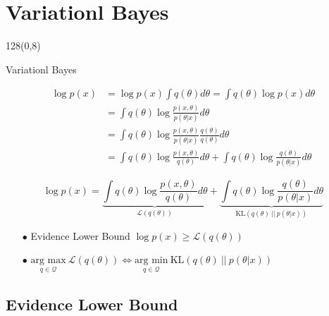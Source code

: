 \documentclass[shownotes]{beamer}
\begin{document}
\section{Variationl Bayes}

\begin{frame}
 \begin{textblock}{128}(0,8)
\begin{center}
 \large Variationl Bayes
\end{center}
\end{textblock}

\begin{equation*}
 \begin{split}
 \log p(x) &= \log p(x) \int q(\theta) d\theta =  \int q(\theta) \log p(x) d\theta \\
 & = \int q(\theta) \log \frac{p(x,\theta)}{p(\theta|x)} d\theta \\
 & = \int q(\theta) \log \frac{p(x,\theta)}{p(\theta|x)} \frac{q(\theta)}{q(\theta)} d\theta \\
 & = \int q(\theta) \log \frac{p(x,\theta)}{q(\theta)} d\theta + \int q(\theta) \log \frac{q(\theta)}{p(\theta|x)} d\theta 
 \end{split}
\end{equation*}


\end{frame}

\begin{frame}

\begin{equation*}
 \log p(x)  = \underbrace{\int q(\theta) \log \frac{p(x,\theta)}{q(\theta)} d\theta}_{\mathcal{L}(q(\theta))} + \underbrace{\int q(\theta) \log \frac{q(\theta)}{p(\theta|x)} d\theta}_{\text{KL}(q(\theta) \ || \ p(\theta|x))}  
\end{equation*}


\pause

\begin{itemize}
 \item[$\bullet$] Evidence Lower Bound $\log p(x) \geq \mathcal{L}(q(\theta))$
 \item[$\bullet$] $ \underset{q \in \mathcal{Q}}{\text{arg max}} \ \mathcal{L}(q(\theta)) \Leftrightarrow\underset{q \in \mathcal{Q}}{\text{arg min}} \ \text{KL}(q(\theta) \ || \ p(\theta|x))$ 
\end{itemize}


\end{frame}

\subsection{Evidence Lower Bound}
\end{document}
